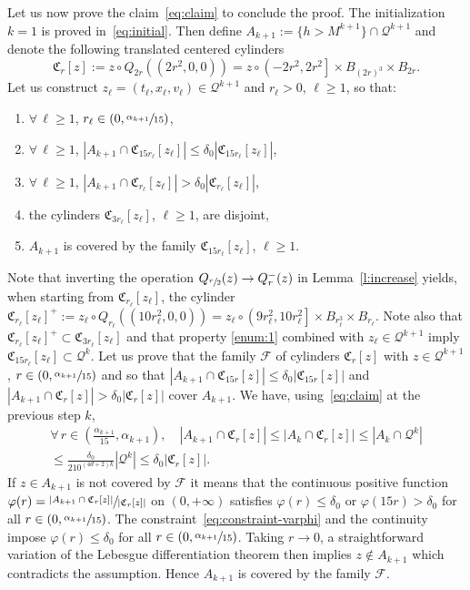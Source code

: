 \documentclass[10pt]{amsart}
\let\mathcal\mathscr
\theoremstyle{definition}
\theoremstyle{remark}
\newcommand{\cQ}{\mathcal Q}
\begin{document}
Let us now prove the claim~\eqref{eq:claim} to conclude the
proof. The initialization $k=1$ is proved
in~\eqref{eq:initial}. Then define
$A_{k+1} := \{ h > M^{k+1} \} \cap \cQ^{k+1}$ and denote
the following translated centered cylinders
\[
\mathfrak C_{r}[z] :=z\circ Q_{2r}((2r^2,0,0))= z \circ
\left(-2r^2,2r^2\right]\times B_{(2r)^3} \times B_{2r}.
\]
Let us
construct $z_\ell=(t_\ell,x_\ell,v_\ell)\in \cQ^{k+1}$ and
$r_\ell >0$, $\ell \ge 1$, so that:
\begin{enumerate}
\item\label{enum:1} $\forall \, \ell \ge 1$, $r_\ell \in (0,\sfrac{\alpha_{k+1}}{15})$,
\item\label{enum:2} $\forall \, \ell \ge 1$,
$|A_{k+1} \cap \mathfrak C_{15r_\ell}[z_\ell]| \le \delta_0
|\mathfrak C_{15 r_\ell}[z_\ell]|$,
\item\label{enum:3} $\forall \, \ell \ge 1$,
$|A_{k+1} \cap \mathfrak C_{r_\ell}[z_\ell]| > \delta_0
|\mathfrak C_{r_\ell}[z_\ell]|$,
\item\label{enum:4} the cylinders $\mathfrak C_{3r_\ell}[z_\ell]$, $\ell \ge
1$, are disjoint,
\item\label{enum:5} $A_{k+1}$ is covered by the family $\mathfrak
C_{15r_\ell}[z_\ell]$, $\ell \ge 1$.
\end{enumerate}
Note that inverting the operation
$Q_{\sfrac{r}{2}}(z) \to Q_{r}^-(z)$ in Lemma~\ref{l:increase}
yields, when starting from $\mathfrak C_{r_\ell}[z_\ell]$, the
cylinder
$\mathfrak C_{r_\ell}[z_\ell]^+ :=z_\ell\circ
Q_{r_\ell}((10r_\ell^2,0,0))= z_\ell \circ
\left(9r_\ell^2,10r_\ell^2\right]\times B_{r_\ell^3} \times
B_{r_\ell}$. Note also that
$\mathfrak C_{r_\ell}[z_\ell]^+ \subset \mathfrak C_{3
r_\ell}[z_\ell]$ and that property \eqref{enum:1} combined with
$z_\ell \in \cQ^{k+1}$ imply
$\mathfrak C_{15r_\ell}[z_\ell] \subset \cQ^k$. Let us prove
that the family $\mathcal F$ of cylinders $\mathfrak C_{r}[z]$
with $z \in \cQ^{k+1}$, $r \in (0,\sfrac{\alpha_{k+1}}{15})$ and
so that
$|A_{k+1} \cap \mathfrak C_{15r}[z]| \le \delta_0 |\mathfrak
C_{15 r}[z]|$ and
$|A_{k+1} \cap \mathfrak C_{r}[z]| > \delta_0 |\mathfrak
C_{r}[z]|$ cover $A_{k+1}$. We have, using~\eqref{eq:claim} at
the previous step $k$,
\begin{multline}
\label{eq:constraint-varphi}
\forall \, r \in
\left(\frac{\alpha_{k+1}}{15},\alpha_{k+1}\right), \quad
|A_{k+1} \cap \mathfrak C_{r}[z]| \le |A_{k} \cap \mathfrak
C_{r}[z]| \le |A_{k} \cap \cQ^k| \\
\le \frac{\delta_0}{210^{(4d+2)k}} |\cQ^k| \le \delta_0
|\mathfrak C_{r}[z]|.
\end{multline}
If $z \in A_{k+1}$ is not covered by $\mathcal F$ it means that
the continuous positive function
$\varphi(r) = \sfrac{|A_{k+1} \cap \mathfrak C_{r}[z]|}{|\mathfrak
C_{r}[z]|}$ on $(0,+\infty)$ satisfies $\varphi(r) \le \delta_0$
or $\varphi(15r) > \delta_0$ for all
$r \in (0,\sfrac{\alpha_{k+1}}{15})$. The
constraint~\eqref{eq:constraint-varphi} and the continuity impose
$\varphi(r) \le \delta_0$ for all
$r \in\nobreak (0,\sfrac{\alpha_{k+1}}{15})$. Taking $r \to 0$, a
straightforward variation of the Lebesgue differentiation theorem
then implies $z\notin A_{k+1}$ which contradicts the
assumption. Hence $A_{k+1}$ is covered by the family $\mathcal
F$.
\end{document}
